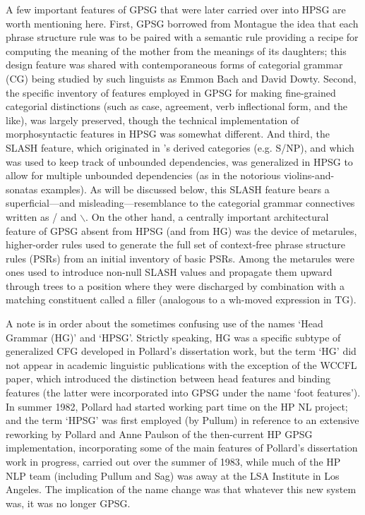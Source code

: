 \documentclass[output=paper]{langsci/langscibook}
\begin{document}
A few important features of GPSG that were later carried over into HPSG are worth mentioning here. First, GPSG borrowed from Montague the idea that each phrase structure rule was to be paired with a semantic rule providing a recipe for computing the meaning of the mother from the meanings of its daughters; this design feature was shared with contemporaneous forms of categorial grammar (CG) being studied by such linguists as Emmon Bach and David Dowty.  Second, the specific inventory of features employed in GPSG for making fine-grained categorial distinctions (such as case, agreement, verb inflectional form, and the like), was largely preserved, though the technical implementation of morphosyntactic features in HPSG was somewhat different. And third, the SLASH feature, which originated in \citet{Gazdar81}'s derived categories (e.g. S/NP), and which was used to keep track of unbounded dependencies, was generalized in HPSG to allow for multiple unbounded dependencies (as in the notorious violins-and-sonatas examples). As will be discussed below, this SLASH feature bears a superficial---and misleading---resemblance to the categorial grammar connectives written as / and $\backslash$. On the other hand, a centrally important architectural feature of GPSG absent from HPSG (and from HG) was the device of metarules, higher-order rules used to generate the full set of context-free phrase structure rules (PSRs) from an initial inventory of basic PSRs. Among the metarules were ones used to introduce non-null SLASH values and propagate them upward through trees to a position where they were discharged by combination with a matching constituent called a filler (analogous to a wh-moved expression in TG).

A note is in order about the sometimes confusing use of the names  `Head Grammar (HG)' and `HPSG'. Strictly speaking, HG was a specific subtype of generalized CFG developed in Pollard's dissertation work, but the term `HG' did not appear in academic linguistic publications with the exception of the \citet{PollardSag1983} WCCFL paper, which introduced the distinction between head features and binding features (the latter were incorporated into GPSG under the name `foot features'). In summer 1982, Pollard had started working part time on the HP NL project; and the term `HPSG' was first employed (by Pullum) in reference to an extensive reworking by Pollard and Anne Paulson of the then-current HP GPSG implementation, incorporating some of the main features of Pollard's dissertation work in progress, carried out over the summer of 1983, while much of the HP NLP team (including Pullum and Sag) was away at the LSA Institute in Los Angeles.  The implication of the name change was that whatever this new system was, it was no longer GPSG.
\end{document}
